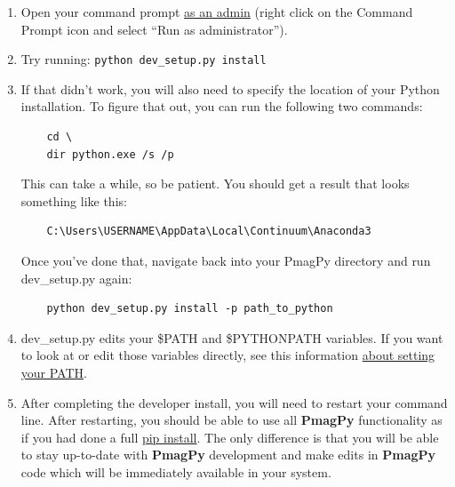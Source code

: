 \documentclass[11pt]{book}
\begin{document}
{\begin{enumerate}
\item Open your command prompt \href{http://www.thewindowsclub.com/how-to-run-command-prompt-as-an-administrator}{as an admin} (right click on the Command Prompt icon and select ``Run as administrator'').



\item Try running: \verb!python dev_setup.py install!

\item  If that didn't work, you will also need to specify the location of your Python installation.  To figure that out, you can run the following two commands:
\begin{verbatim}
    cd \
    dir python.exe /s /p
\end{verbatim}

This can take a while, so be patient.  You should get a result that looks something like this:

\begin{verbatim}
    C:\Users\USERNAME\AppData\Local\Continuum\Anaconda3
\end{verbatim}

Once you've done that, navigate back into your PmagPy directory and run dev\_setup.py again:

\begin{verbatim}
    python dev_setup.py install -p path_to_python
\end{verbatim}

\item dev\_setup.py edits your \$PATH and \$PYTHONPATH variables.  If you want to look at or edit those variables directly, see this information \href{https://www.java.com/en/download/help/path.xml}{about setting your PATH}.

\item After completing the developer install, you will need to restart your command line.  After restarting, you should be able to use all {\bf PmagPy} functionality as if you had done a full \href{#pip_install}{pip install}.  The only difference is that you will be able to stay up-to-date with {\bf PmagPy} development and make edits in {\bf PmagPy} code which will be immediately available in your system.


\end{enumerate}}
\end{document}
